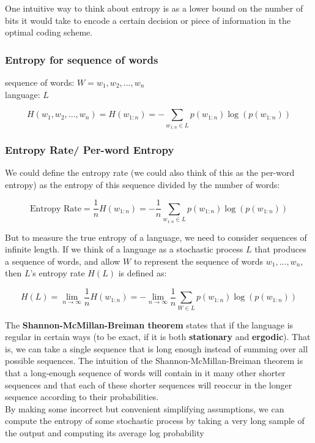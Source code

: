 One intuitive way to think about entropy is as a lower bound on the number of bits it would take to encode a certain decision or piece of information in the optimal coding scheme.

\subsubsection{Entropy for sequence of words}\label{Entropy for sequence of words}
sequence of words: $W = {w_1,w_2,...,w_n}$\\
language: $L$

\[
    H(w_1,w_2,...,w_n) = H(w_{1:n}) = -\displaystyle\sum_{w_{1:n}\in L} p(w_{1:n})\log(p(w_{1:n}))
\]

\subsubsection{Entropy Rate/ Per-word Entropy}
We could define the entropy rate (we could also think of this as the per-word entropy) as the entropy of this sequence divided by the number of words:

\[
    \text{Entropy Rate} = \displaystyle\frac{1}{n}H(w_{1:n}) = -\displaystyle\frac{1}{n}\sum_{w_{1:n}\in L} p(w_{1:n})\log(p(w_{1:n}))
\]

But to measure the true entropy of a language, we need to consider sequences of infinite length. If we think of a language as a stochastic process $L$ that produces a sequence of words, and allow $W$ to represent the sequence of words $w_1,...,w_n$, then $L$’s entropy rate $H(L)$ is defined as:

\[
    H(L) = \lim_{n \rightarrow \infty} \displaystyle\frac{1}{n}H(w_{1:n}) = -\lim_{n \rightarrow \infty} \displaystyle\frac{1}{n}\sum_{W \in L} p(w_{1:n})\log(p(w_{1:n}))
\]

The \textbf{Shannon-McMillan-Breiman theorem} states that if the language is regular in certain ways (to be exact, if it is both \textbf{stationary} and \textbf{ergodic}). That is, we can take a single sequence that is long enough instead of summing over all possible sequences. The intuition of the Shannon-McMillan-Breiman theorem is that a long-enough sequence of words will contain in it many other shorter sequences and that each of these shorter sequences will reoccur in the longer sequence according to their probabilities.\\By making some incorrect but convenient simplifying assumptions, we can compute the entropy of some stochastic process by taking a very long sample of the output and computing its average log probability

